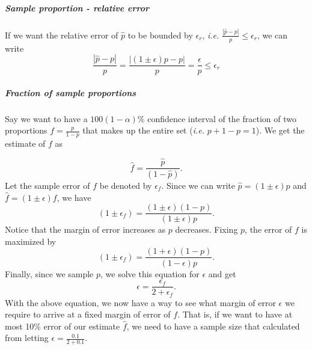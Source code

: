 \documentclass[a4paper,6pt]{article}
\begin{document}

\subparagraph{Sample proportion - relative error} %
\label{subp:sample_proportion_relative_error}
If we want the relative error of $\hat{p}$ to be bounded by $\epsilon_r$, \emph{i.e.} $\frac{|\hat{p} -p|}{p} \leq \epsilon_r$, we can write 
\begin{equation}
\label{eqn:relative_error}
	\frac{|\hat{p} -p|}{p} = \frac{|(1\pm\epsilon)p-p|}{p} = \frac{\epsilon}{p} \leq \epsilon_r
\end{equation}


\subparagraph{Fraction of sample proportions} %
\label{subp:fraction_of_proportions}
Say we want to have a $100(1-\alpha)\%$ confidence interval of the fraction of two proportions $f =\frac{p}{1-p}$ that makes up the entire set (\emph{i.e.} $p + 1-p = 1$). We get the estimate of $f$ as

\begin{equation*}
 	\hat{f} = \frac{\hat{p}}{(1-\hat{p})}.
\end{equation*} 
Let the sample error of $f$ be denoted by $\epsilon_f$. Since we can write $\hat{p} = (1 \pm \epsilon)p$ and $\hat{f} = (1 \pm \epsilon)f$, we have
\begin{equation*}
 	(1\pm \epsilon_f) = \frac{(1\pm \epsilon)(1-p)}{(1\pm \epsilon)p}. 
 \end{equation*} 
Notice that the margin of error increases as $p$ decreases. Fixing $p$, the error of $f$ is maximized by  
\begin{equation*}
 	(1\pm \epsilon_f) = \frac{(1 + \epsilon)(1-p)}{(1- \epsilon)p}. 
 \end{equation*} 
 Finally, since we sample $p$, we solve this equation for $\epsilon$ and get
\begin{equation}
 	\epsilon = \frac{\epsilon_f}{2 + \epsilon_f}. 
 \end{equation}
With the above equation, we now have a way to see what margin of error $\epsilon$ we require to arrive at a fixed margin of error of $f$. That is, if we want to have at most 10\% error of our estimate $\hat{f}$, we need to have a sample size that calculated from letting $\epsilon = \frac{0.1}{2 + 0.1}$.

\end{document}
